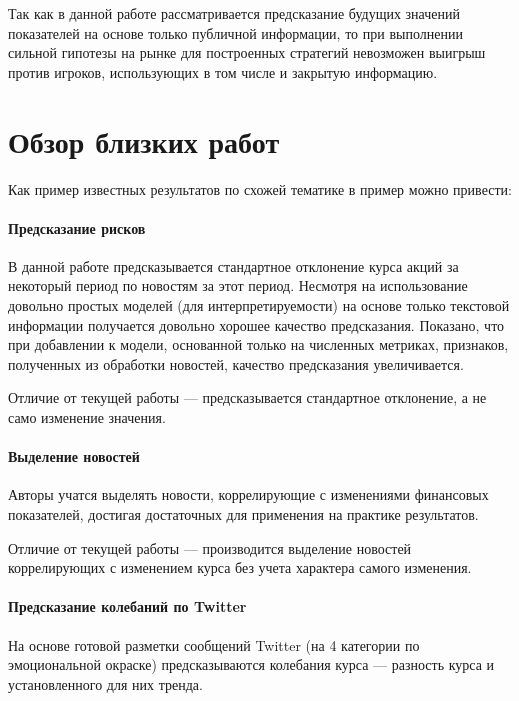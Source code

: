 \documentclass[pdftex,ptm,14pt,a4paper]{report}
\begin{document}
Так как в данной работе рассматривается предсказание будущих значений показателей на основе только публичной информации,
то при выполнении сильной гипотезы на рынке для построенных стратегий невозможен выигрыш против игроков, использующих в том
числе и закрытую информацию.

\section{Обзор близких работ}

\fi

Как пример известных результатов по схожей тематике в пример можно привести:

\paragraph{Предсказание рисков \cite{risk_predict}}

В данной работе предсказывается стандартное отклонение курса акций за некоторый период по новостям за этот период.
Несмотря на использование довольно простых моделей (для интерпретируемости) на основе только текстовой информации получается
довольно хорошее качество предсказания. Показано, что при добавлении к модели, основанной только на численных метриках,
 признаков, полученных из обработки новостей, качество предсказания увеличивается.

Отличие от текущей работы --- предсказывается стандартное отклонение, а не само изменение значения.

\paragraph{Выделение новостей \cite{select_important_news}}

Авторы учатся выделять новости, коррелирующие с изменениями финансовых показателей, достигая достаточных для
применения на практике результатов.

Отличие от текущей работы --- производится выделение новостей коррелирующих с изменением курса без учета характера
самого изменения.

\paragraph{Предсказание колебаний по Twitter \cite{stock_from_twitter}}

На основе готовой разметки сообщений Twitter (на 4 категории по эмоциональной окраске) предсказываются колебания курса --- разность курса и установленного для них тренда.
\end{document}
